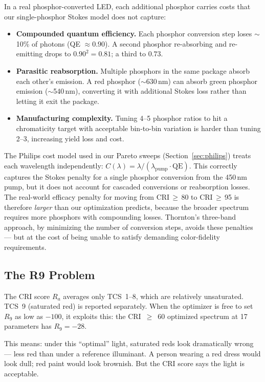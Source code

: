 \documentclass[11pt]{article}
\begin{document}
In a real phosphor-converted LED, each additional phosphor
carries costs that our single-phosphor Stokes model does not
capture:
\begin{itemize}
\item \textbf{Compounded quantum efficiency.}  Each phosphor
  conversion step loses $\sim$10\% of photons (QE $\approx 0.90$).
  A second phosphor re-absorbing and re-emitting drops to
  $0.90^2 = 0.81$; a third to $0.73$.

\item \textbf{Parasitic reabsorption.}  Multiple phosphors in
  the same package absorb each other's emission.  A red phosphor
  ($\sim$630\,nm) can absorb green phosphor emission
  ($\sim$540\,nm), converting it with additional Stokes loss
  rather than letting it exit the package.

\item \textbf{Manufacturing complexity.}  Tuning 4--5 phosphor
  ratios to hit a chromaticity target with acceptable bin-to-bin
  variation is harder than tuning 2--3, increasing yield loss
  and cost.
\end{itemize}

\noindent The Philips cost model used in our Pareto sweeps
(Section~\ref{sec:philips}) treats each wavelength independently:
$C(\lambda) = \lambda / (\lambda_\mathrm{pump} \cdot \mathrm{QE})$.
This correctly captures the Stokes penalty for a single phosphor
conversion from the 450\,nm pump, but it does not account for
cascaded conversions or reabsorption losses.  The real-world
efficacy penalty for moving from CRI\,$\geq$\,80 to
CRI\,$\geq$\,95 is therefore \emph{larger} than our optimization
predicts, because the broader spectrum requires more phosphors
with compounding losses.  Thornton's three-band approach, by
minimizing the number of conversion steps, avoids these
penalties --- but at the cost of being unable to satisfy demanding
color-fidelity requirements.

\subsection{The R9 Problem}

The CRI score $R_a$ averages only TCS~1--8, which are relatively
unsaturated.  TCS~9 (saturated red) is reported separately.  When the
optimizer is free to set $R_9$ as low as $-100$, it exploits this:
the CRI~$\geq$~60 optimized spectrum at 17 parameters has $R_9 = -28$.

This means: under this ``optimal'' light, saturated reds look dramatically
wrong --- less red than under a reference illuminant.  A person wearing a
red dress would look dull; red paint would look brownish.  But the CRI
score says the light is acceptable.
\end{document}
